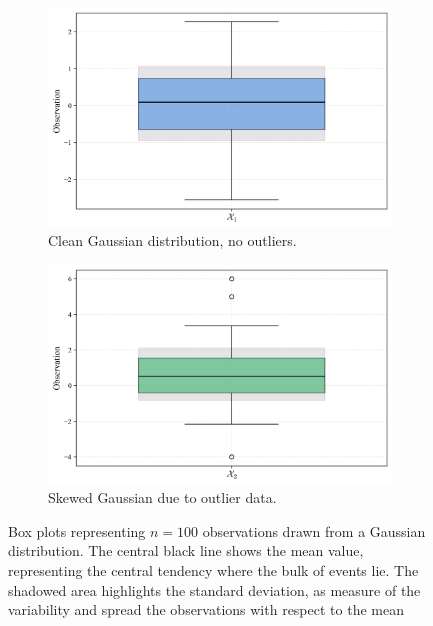 \documentclass{book}
\begin{document}
\begin{figure}[ht]
    \centering
    \begin{subfigure}[b]{0.48\textwidth}
        \centering
        \includegraphics[width=\textwidth, height=0.7\textwidth]{figures/chapter1/box_1.png}
        \caption{Clean Gaussian distribution, no outliers.}
        \label{fig:box1}
    \end{subfigure}
    \hfill
    \begin{subfigure}[b]{0.48\textwidth}
        \centering
        \includegraphics[width=\textwidth, height=0.7\textwidth]{figures/chapter1/box_2.png}
        \caption{Skewed Gaussian due to outlier data.}
        \label{fig:box2}
    \end{subfigure}
    \caption{Box plots representing $n = 100$ observations drawn from a Gaussian distribution. The central black line shows the mean value, representing the central tendency where the bulk of events lie. The shadowed area highlights the standard deviation, as measure of the variability and spread the observations with respect to the mean}
    \label{fig:box_comparison}
\end{figure}
\end{document}
